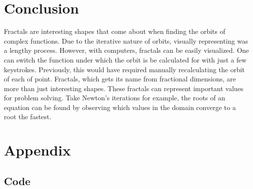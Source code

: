\documentclass[letterpaper,11pt]{article}
\begin{document}
\section{Conclusion}
Fractals are interesting shapes that come about when finding the orbits of complex functions. Due to the iterative nature of orbits, visually representing was a lengthy process. However, with computers, fractals can be easily visualized. One can switch the function under which the orbit is be calculated for with just a few keystrokes. Previously, this would have required manually recalculating the orbit of each of point. Fractals, which gets its name from fractional dimensions, are more than just interesting shapes. These fractals can represent important values for problem solving. Take Newton's iterations for example, the roots of an equation can be found by observing which values in the domain converge to a root the fastest. 

\section{Appendix}

\subsection{Code}

\end{document}
